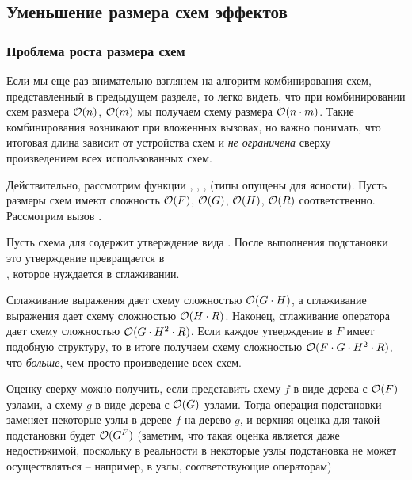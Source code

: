\subsection{Уменьшение размера схем эффектов}

\label{section-schemas-reducing}

\subsubsection{Проблема роста размера схем}

Если мы еще раз внимательно взглянем на алгоритм комбинирования схем, представленный в предыдущем разделе, то легко видеть, что при комбинировании схем размера $\mathcal{O}(n)$, $\mathcal{O}(m)$ мы получаем схему размера $\mathcal{O}(n \cdot m)$. Такие комбинирования возникают при вложенных вызовах, но важно понимать, что итоговая длина зависит от устройства схем и \emph{не ограничена} сверху произведением всех использованных схем. 

Действительно, рассмотрим функции , , ,  (типы опущены для ясности). Пусть размеры схем имеют сложность $\mathcal{O}(F)$, $\mathcal{O}(G)$, $\mathcal{O}(H)$, $\mathcal{O}(R)$ соответственно. Рассмотрим вызов . 

Пусть схема для  содержит утверждение вида . После выполнения подстановки это утверждение превращается в \\
, которое нуждается в сглаживании. 

Сглаживание выражения  дает схему сложностью $\mathcal{O}(G \cdot H)$, а сглаживание выражения  дает схему сложностью $\mathcal{O}(H \cdot R)$. Наконец, сглаживание оператора \code{\&\&} дает схему сложностью $\mathcal{O}(G \cdot H^2 \cdot R)$. Если каждое утверждение в $F$ имеет подобную структуру, то в итоге получаем схему сложностью $\mathcal{O}(F \cdot G \cdot H^2 \cdot R)$, что \emph{больше}, чем просто произведение всех схем.

Оценку сверху можно получить, если представить схему $f$ в виде дерева с $\mathcal{O}(F)$ узлами, а схему $g$ в виде дерева с $\mathcal{O}(G)$ узлами. Тогда операция подстановки заменяет некоторые узлы в дереве $f$ на дерево $g$, и верхняя оценка для такой подстановки будет $\mathcal{O}(G^F)$ (заметим, что такая оценка является даже недостижимой, поскольку в реальности в некоторые узлы подстановка не может осуществляться -- например, в узлы, соответствующие операторам)

